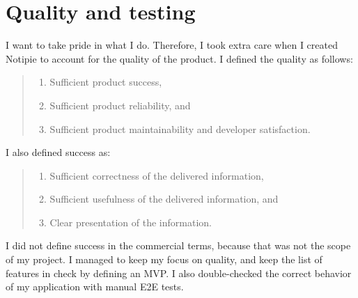 \section{Quality and testing}\label{sec:quality}

I want to take pride in what I do.
Therefore,
I took extra care when I created Notipie
to account for the quality of the product.
I defined the quality as follows:

\begin{quote}
  \begin{enumerate}
    \item Sufficient product success,
    \item Sufficient product reliability, and
    \item Sufficient product maintainability and developer satisfaction.
  \end{enumerate}
\end{quote}

I also defined success as:

\begin{quote}
  \begin{enumerate}
    \item Sufficient correctness of the delivered information,
    \item Sufficient usefulness of the delivered information, and
    \item Clear presentation of the information.
  \end{enumerate}
\end{quote}

I did not define success in the commercial terms,
because that was not the scope of my project.
I managed to keep my focus on quality,
and keep the list of features in check
by defining an \ac{MVP}.
I also double-checked the correct behavior
of my application with manual \ac{E2E} tests.




